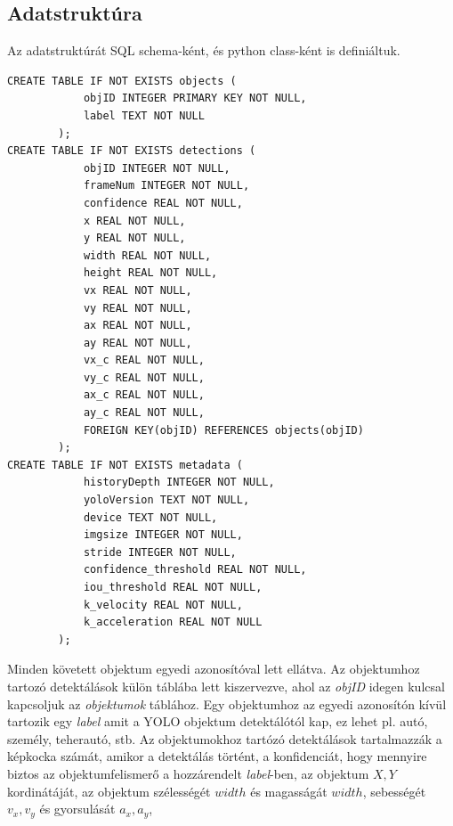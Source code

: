 \documentclass[acmtog, authorversion]{acmart}
\begin{document}
\subsection{Adatstruktúra}
Az adatstruktúrát SQL schema-ként, és python class-ként is definiáltuk.
\begin{verbatim}
CREATE TABLE IF NOT EXISTS objects (
            objID INTEGER PRIMARY KEY NOT NULL,
            label TEXT NOT NULL
        );
CREATE TABLE IF NOT EXISTS detections (
            objID INTEGER NOT NULL,
            frameNum INTEGER NOT NULL,
            confidence REAL NOT NULL,
            x REAL NOT NULL,
            y REAL NOT NULL,
            width REAL NOT NULL,
            height REAL NOT NULL,
            vx REAL NOT NULL,
            vy REAL NOT NULL,
            ax REAL NOT NULL,
            ay REAL NOT NULL,
            vx_c REAL NOT NULL,
            vy_c REAL NOT NULL,
            ax_c REAL NOT NULL,
            ay_c REAL NOT NULL,
            FOREIGN KEY(objID) REFERENCES objects(objID)
        );
CREATE TABLE IF NOT EXISTS metadata (
            historyDepth INTEGER NOT NULL,
            yoloVersion TEXT NOT NULL,   
            device TEXT NOT NULL,
            imgsize INTEGER NOT NULL,
            stride INTEGER NOT NULL,
            confidence_threshold REAL NOT NULL,
            iou_threshold REAL NOT NULL,
            k_velocity REAL NOT NULL,
            k_acceleration REAL NOT NULL
        );
\end{verbatim}
Minden követett objektum egyedi azonosítóval lett ellátva. Az objektumhoz tartozó detektálások külön táblába lett kiszervezve,
ahol az \textit{objID} idegen kulcsal kapcsoljuk az \textit{objektumok} táblához. Egy objektumhoz az egyedi azonosítón kívül
tartozik egy \textit{label} amit a YOLO objektum detektálótól kap, ez lehet pl. autó, személy, teherautó, stb. Az objektumokhoz
tartózó detektálások tartalmazzák a képkocka számát, amikor a detektálás történt, a konfidenciát, hogy mennyire biztos az
objektumfelismerő a hozzárendelt \textit{label}-ben, az objektum \begin{math}X,Y\end{math} kordinátáját, az objektum szélességét
\begin{math}width\end{math} és magasságát \begin{math}width\end{math}, sebességét \begin{math}v_x,v_y\end{math} és gyorsulását \begin{math}a_x,a_y\end{math}, 
\end{document}
